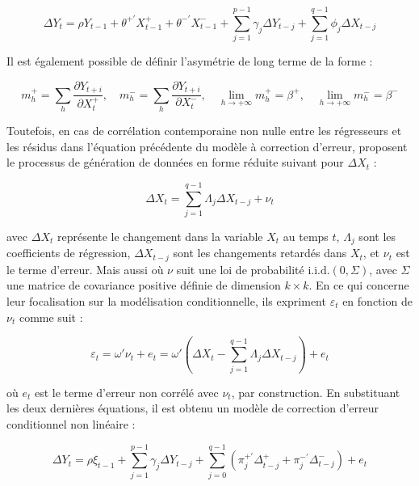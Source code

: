 \begin{sloppypar}
\begin{equation}
    \Delta Y_t = \rho Y_{t-1} + \theta^{+'} X^+_{t-1} + \theta^{-'} X_{t-1}^- + \sum_{j=1}^{p-1} \gamma_j \Delta Y_{t-j} + \sum_{j=1}^{q-1} \phi_j \Delta X_{t-j}
\end{equation}

Il est également possible de définir l'asymétrie de long terme de la forme : 

\[
m_h^+ = \sum_{h} \frac{\partial Y_{t+i}}{\partial X_t^+}, \quad m_h^- = \sum_{h} \frac{\partial Y_{t+i}}{\partial X_t^-}, \quad \lim_{h\to +\infty} m_h^+ = \beta^+, \quad \lim_{h\to +\infty} m_h^- = \beta^- \]

Toutefois, en cas de corrélation contemporaine non nulle entre les régresseurs et les résidus dans l'équation précédente du modèle à correction d'erreur, \cite{Shin} proposent le processus de génération de données en forme réduite suivant pour $\Delta X_t$ :

\begin{equation}
  \Delta X_t = \sum_{j=1}^{q-1} \Lambda_j \Delta X_{t-j} + \nu_t  
\end{equation}

avec \( \Delta X_t \) représente le changement dans la variable \( X_t \) au temps \( t \), \( \Lambda_j \) sont les coefficients de régression, \( \Delta X_{t-j} \) sont les changements retardés dans \( X_t \), et \( \nu_t \) est le terme d'erreur. Mais aussi où \( \nu \) suit une loi de probabilité \( \text{i.i.d.}(0, \Sigma) \), avec \( \Sigma \) une matrice de covariance positive définie de dimension \( k \times k \). En ce qui concerne leur focalisation sur la modélisation conditionnelle, ils expriment \( \varepsilon_t \) en fonction de \( \nu_t \) comme suit : 

\begin{equation}
\varepsilon_t = \omega' \nu_t + e_t = \omega' \left( \Delta X_t - \sum_{j=1}^{q-1} \Lambda_j \Delta X_{t-j} \right) + e_t
\end{equation}

où \(e_t\) est le terme d'erreur non corrélé avec \( \nu_t \), par construction. En substituant les deux dernières équations, il est obtenu un modèle de correction d'erreur conditionnel non linéaire :

\begin{equation}
   \Delta Y_t = \rho \xi_{t-1} + \sum_{j=1}^{p-1} \gamma_j \Delta Y_{t-j} + \sum_{j=0}^{q-1} \left ( \pi_j^{+'} \Delta_{t-j}^+ + \pi_j^{-'} \Delta_{t-j}^- \right ) + e_t 
\end{equation}


\end{sloppypar}
